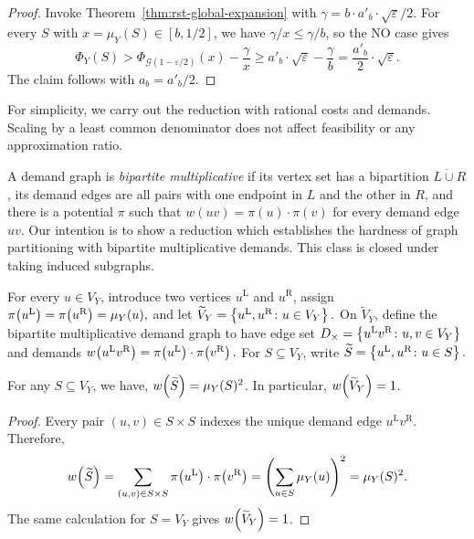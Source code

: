 \begin{proof}
    Invoke Theorem~\ref{thm:rst-global-expansion} with
    $\gamma=b\cdot a'_b\cdot\sqrt{\varepsilon}/2$. For every $S$ with $x=\mu_Y(S)\in[b,1/2]$, we have $\gamma/x\leq\gamma/b$, so the NO case gives
    \[
        \Phi_Y(S)>
        \Phi_{\mathcal{G}(1-\varepsilon/2)}(x)-\frac{\gamma}{x}
        \geq a'_b\cdot\sqrt{\varepsilon}-\frac{\gamma}{b}
        =\frac{a'_b}{2}\cdot\sqrt{\varepsilon}.
    \]
    The claim follows with $a_b=a'_b/2$.
\end{proof}


\iffalse
For simplicity, we carry out the reduction with rational costs and demands. Scaling by a least common denominator does not affect feasibility or any approximation ratio.

A demand graph is \emph{bipartite multiplicative} if its vertex set has a bipartition $L\mathbin{\dot\cup}R$, its demand edges are all pairs with one endpoint in $L$ and the other in $R$, and there is a potential $\pi$ such that $w(uv)=\pi(u)\cdot \pi(v)$ for every demand edge $uv$. Our intention is to show a reduction which establishes the hardness of graph partitioning with bipartite multiplicative demands.
This class is closed under taking induced subgraphs.


    For every $u\in V_Y$, introduce two vertices $u^{\mathrm L}$ and $u^{\mathrm R}$, assign $
        \pi\mathopen{}\left( u^{\mathrm L} \right)=\pi\mathopen{}\left( u^{\mathrm R} \right)=\mu_Y(u),$
    and let $
        \widetilde V_Y
        =\mathopen{}\left\{ u^{\mathrm L},u^{\mathrm R}\colon u\in V_Y \right\}.$
    On $\widetilde V_Y$, define the bipartite multiplicative demand graph to have edge set $
        D_\times
        =\mathopen{}\left\{ u^{\mathrm L}v^{\mathrm R}\colon u,v\in V_Y \right\}$ and demands $
        w\mathopen{}\left( u^{\mathrm L}v^{\mathrm R} \right)
        =\pi\mathopen{}\left( u^{\mathrm L} \right)\cdot \pi\mathopen{}\left( v^{\mathrm R} \right).$
    For $S\subseteq V_Y$, write $
        \widetilde S=\mathopen{}\left\{ u^{\mathrm L},u^{\mathrm R}\colon u\in S \right\}.$
\begin{lemma}\label{lem:multiplicative-demands-encode-measure}
    For any $S\subseteq V_Y$, we have, $
        {w\mathopen{}\left( \widetilde S \right)}
        =\mu_Y(S)^2$. In particular, $w\mathopen{}\left( \widetilde V_Y \right)=1$.
\end{lemma}
\begin{proof}
    Every pair $(u,v)\in S\times S$ indexes the unique demand edge $u^{\mathrm L}v^{\mathrm R}$. Therefore,
    \[
        w\mathopen{}\left( \widetilde S \right)
        =\sum_{(u,v)\in S\times S}\pi\mathopen{}\left( u^{\mathrm L} \right)\cdot \pi\mathopen{}\left( v^{\mathrm R} \right)
        =\left(\sum_{u\in S}\mu_Y(u)\right)^2
        =\mu_Y(S)^2.
    \]
    The same calculation for $S=V_Y$ gives $w\mathopen{}\left( \widetilde V_Y \right)=1$.
\end{proof}

